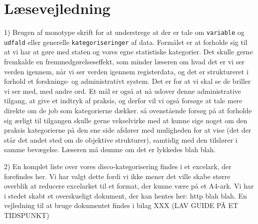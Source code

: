 \section{Læsevejledning \label{}}

1) Brugen af monotype skrift for at understrege at der er tale om \texttt{variable} og \texttt{udfald} eller generelle \texttt{kategoriseringer} af data. Formålet er at forholde sig til at vi har at gøre med staten og vores egne statistiske kategorier. Det skulle gerne fremkalde en fremmedgørelseseffekt, som minder læseren om hvad det er vi ser verden igennem, når vi ser verden igennem registerdata, og det er struktureret i forhold et forsknings- og administrativt system. Det er for at vi skal se de briller vi ser med, med andre ord. Et mål er også at nå udover denne administrative tilgang, at give et indtryk af praksis, og derfor vil vi også forsøge at tale mere direkte om de job som kategorierne dækker. så ovenstående forsøg på at forholde sig ærligt til tilgangen skulle gerne vekselvirke med at kunne sige noget om den praksis kategorierne på den ene side afslører med muligheden for at vise (det der står det andet sted om de objektive strukturer), samtidig med den tilslører i samme bevægelse. Læseren må dømme om det er lykkedes blah blah.

2) En komplet liste over vores disco-kategorisering findes i et excelark, der forefindes her. Vi har valgt dette fordi vi ikke mener det ville skabe større overblik at reducere excelarket til et format, der kunne være på et A4-ark. Vi har i stedet skabt et overskueligt dokument, der kan hentes her: http blah blah. En vejledning til at bruge dokumentet findes i bilag XXX (LAV GUIDE PÅ ET TIDSPUNKT)




